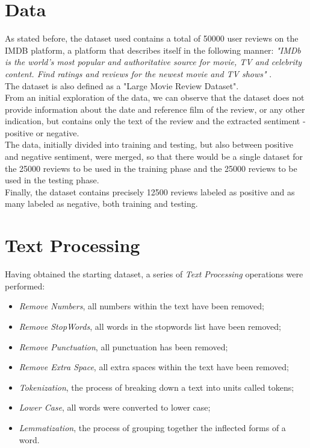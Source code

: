 \documentclass[fleqn,10pt]{SelfArx} %
\begin{document}
\section{Data}
As stated before, the dataset used contains a total of 50000 user reviews on the IMDB platform, a platform that describes itself in the following manner: \textit{"IMDb is the world's most popular and authoritative source for movie, TV and celebrity content. Find ratings and reviews for the newest movie and TV shows"} \cite{IMDB}.\\
The dataset is also defined as a "Large Movie Review Dataset".\\
From an initial exploration of the data, we can observe that the dataset does not provide information about the date and reference film of the review, or any other indication, but contains only the text of the review and the extracted sentiment - positive or negative.\\
The data, initially divided into training and testing, but also between positive and negative sentiment, were merged, so that there would be a single dataset for the 25000 reviews to be used in the training phase and the 25000 reviews to be used in the testing phase.\\
Finally, the dataset contains precisely 12500 reviews labeled as positive and as many labeled as negative, both training and testing.

\section{Text Processing}
Having obtained the starting dataset, a series of \textit{Text Processing} operations were performed:
\begin{itemize}
	\item \textit{Remove Numbers}, all numbers within the text have been removed;
	\item \textit{Remove StopWords}, all words in the stopwords list have been removed;
	\item \textit{Remove Punctuation}, all punctuation has been removed;
	\item \textit{Remove Extra Space}, all extra spaces within the text have been removed;
	\item \textit{Tokenization}, the process of breaking down a text into units called tokens;
	\item \textit{Lower Case}, all words were converted to lower case;
	\item \textit{Lemmatization}, the process of grouping together the inflected forms of a word.
\end{itemize}
\end{document}
